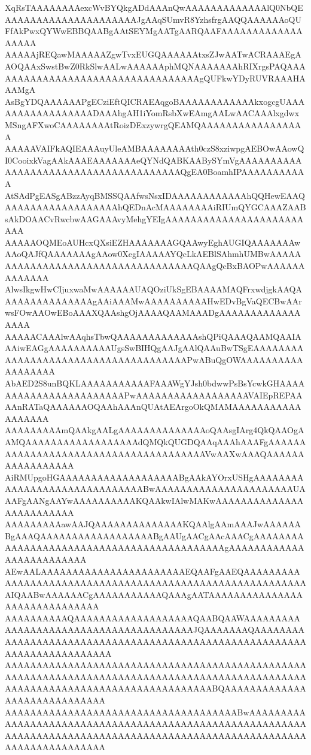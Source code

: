 \documentclass[multi=frame]{standalone}
\begin{document}
\begin{world}
        XqRsTAAAAAAAAexcWvBYQkgADdAAAnQwAAAAAAAAAAAAAlQ0NbQEAAAAAAAAAAAAAAAAAAAAAJgAAqSUmvR8YzhsfrgAAQQAAAAAAoQUFfAkPwxQYWwEBBQAABgAAtSEYMgAATgAARQAAFAAAAAAAAAAAAAAAAAA
        AAAAAjREQawMAAAAAZgwTvxEUGQAAAAAAtxsZJwAATwACRAAAEgAAOQAAxSwstBwZ0RkSlwAALwAAAAAAphMQNAAAAAAAhRIXrgsPAQAAAAAAAAAAAAAAAAAAAAAAAAAAAAAAAAAAgQUFkwYDyRUVRAAAHAAAMgA
        AsBgYDQAAAAAAPgECziEftQICRAEAqgoBAAAAAAAAAAAAkxogcgUAAAAAAAAAAAAAAAAADAAAhgAH1iYomRsbXwEAmgAALwAACAAAlxgdwxMSngAFXwoCAAAAAAAAtRoizDExzywrgQEAMQAAAAAAAAAAAAAAAAA
        AAAAAVAIFkAQIEAAAuyUleAMBAAAAAAAAth0czS8xziwpgAEBOwAAowQI0CooixkVagAAkAAAEAAAAAAAeQYNdQABKAABySYmVgAAAAAAAAAAAAAAAAAAAAAAAAAAAAAAAAAAAAAAQgEA0BoamhIPAAAAAAAAAAA
        AtSAdPgEASgABzzAyqBMSSQAAfwsNsxIDAAAAAAAAAAAAhQQHewEAAQAAAAAAAAAAAAAAAAAAhQEDnAcMAAAAAAAAiRIUmQYGCAAAZAABsAkDOAACvRwcbwAAGAAAvyMehgYEIgAAAAAAAAAAAAAAAAAAAAAAAAA
        AAAAAOQMEoAUHcxQXsiEZHAAAAAAAGQAAwyEghAUGIQAAAAAAAwAAoQAJfQAAAAAAAgAAow0XegIAAAAAYQcLkAEBlSAhmhUMBwAAAAAAAAAAAAAAAAAAAAAAAAAAAAAAAAAAAQAAgQcBxBAOPwAAAAAAAAAAAAA
        AlwsIkgwHwCIjuxwaMwAAAAAAUAQOziUkSgEBAAAAMAQFrxwdjgkAAQAAAAAAAAAAAAAAAgAAiAAAMwAAAAAAAAAAHwEDvBgVaQECBwAArwsFOwAAOwEBoAAAXQAAshgOjAAAAQAAMAAADgAAAAAAAAAAAAAAAAA
        AAAAACAAAlwAAqhsTbwQAAAAAAAAAAAAAshQPiQAAAQAAMQAAIAAAiwEAGgAAAAAAAAAAUgsSwBIHQgAAJgAAlQAAuBwTSgEAAAAAAAAAAAAAAAAAAAAAAAAAAAAAAAAAAAAAPwABuQgOWAAAAAAAAAAAAAAAAAA
        AbAED2S8unBQKLAAAAAAAAAAAFAAAWgYJsh0bdwwPsBsYcwkGHAAAAAAAAAAAAAAAAAAAAAAAPwAAAAAAAAAAAAAAAAAAVAIEpREPAAAAnRATaQAAAAAAOQAAhAAAnQUAtAEArgoOkQMAMAAAAAAAAAAAAAAAAAA
        AAAAAAAAAmQAAkgAALgAAAAAAAAAAAAAAoQAAsgIArg4QkQAAOgAAMQAAAAAAAAAAAAAAAAAAdQMQkQUGDQAAqAAAhAAAFgAAAAAAAAAAAAAAAAAAAAAAAAAAAAAAAAAAAAAAVwAAXwAAAQAAAAAAAAAAAAAAAAA
        AiRMUpgoHGAAAAAAAAAAAAAAAAAAABgAAkAYOrxUSHgAAAAAAAAAAAAAAAAAAAAAAAAAAAAAABwAAAAAAAAAAAAAAAAAAAAAAUAAAFgAANgAAYwAAAAAAAAAAKQAAkwIAlwMAKwAAAAAAAAAAAAAAAAAAAAAAAAA
        AAAAAAAAAawAAJQAAAAAAAAAAAAAAKQAAlgAAmAAAJwAAAAAABgAAAQAAAAAAAAAAAAAAAAAABgAAUgAACgAAcAAACgAAAAAAAAAAAAAAAAAAAAAAAAAAAAAAAAAAAAAAAAAAAgAAAAAAAAAAAAAAAAAAAAAAAAA
        AEwAALAAAAAAAAAAAAAAAAAAAAAAAEQAAFgAAEQAAAAAAAAAAAAAAAAAAAAAAAAAAAAAAAAAAAAAAAAAAAAAAAAAAAAAAAAAAIQAABwAAAAAACgAAAAAAAAAAAQAAAgAATAAAAAAAAAAAAAAAAAAAAAAAAAAAAAA
        AAAAAAAAAAQAAAAAAAAAAAAAAAAAAAQAABQAAWAAAAAAAAAAAAAAAAAAAAAAAAAAAAAAAAAAAAAAAJQAAAAAAAQAAAAAAAAAAAAAAAAAAAAAAAAAAAAAAAAAAAAAAAAAAAAAAAAAAAAAAAAAAAAAAAAAAAAAAAAA
        AAAAAAAAAAAAAAAAAAAAAAAAAAAAAAAAAAAAAAAAAAAAAAAAAAAAAAAAAAAAAAAAAAAAAAAAAAAAAAAAAAAAAAAAAAAAAAAAAAAAAAAAAAAAAAAAAAAAAAAAAAAAAAAAABQAAAAAAAAAAAAAAAAAAAAAAAAAAAAA
        AAAAAAAAAAAAAAAAAAAAAAAAAAAAAAAAAAAAABwAAAAAAAAAAAAAAAAAAAAAAAAAAAAAAAAAAAAAAAAAAAAAAAAAAAAAAAAAAAAAAAAAAAAAAAAAAAAAAAAAAAAAAAAAAAAAAAAAAAAAAAAAAAAAAAAAAAAAAAAA

\end{world}
\end{document}
